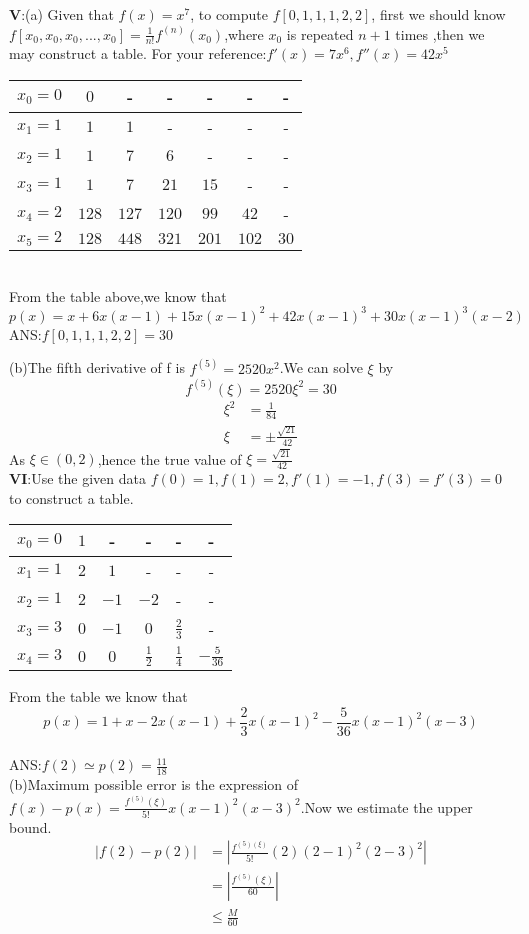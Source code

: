 \documentclass{ctexart}
\begin{document}
\textbf{V}:(a) Given that $f(x)=x^7$, to compute $f[0,1,1,1,2,2]$, first we should know $f[x_0,x_0,x_0,...,x_0]=\frac{1}{n!}f^{(n)}(x_0)$,where $x_0$ is repeated $n+1$ times ,then we may construct a table. For your reference:$f'(x)=7x^6,f''(x)=42x^5$
\begin{table}[!htbp]
    \centering
    \begin{tabular}{|c|c|c|c|c|c|c|}
    \hline
    $x_0=0$&$0$&-&-&-&-&-\\
    \hline
    $x_1=1$&$1$&$1$&-&-&-&-\\
    \hline 
    $x_2=1$&$1$&$7$&$6$&-&-&-\\
    \hline
    $x_3=1$&$1$&$7$&$21$&$15$&-&-\\
    \hline
    $x_4=2$&$128$&$127$&$120$&$99$&$42$&-\\
    \hline
    $x_5=2$&$128$&$448$&$321$&$201$&$102$&$30$\\
    \hline
    \end{tabular}
\end{table}
\\
From the table above,we know that 
$$p(x)=x+6x(x-1)+15x(x-1)^2+42x(x-1)^3+30x(x-1)^3(x-2)$$
ANS:$f[0,1,1,1,2,2]=30$

(b)The fifth derivative of f is $f^{(5)}=2520x^2$.We can solve $\xi$ by
$$f^{(5)}(\xi )=2520\xi^2=30$$
\begin{align*}
    \xi^2&=\frac{1}{84}\\
    \xi&=\pm \frac{\sqrt{21}}{42}
\end{align*}
As $\xi \in (0,2)$,hence the true value of $\xi=\frac{\sqrt{21}}{42}$\\


\textbf{VI}:Use the given data $f(0)=1,f(1)=2,f'(1)=-1,f(3)=f'(3)=0$ to construct a table.

\begin{table}[!htbp]
    \centering
    \begin{tabular}{|c|c|c|c|c|c|}
    \hline
    $x_0=0$&$1$&-&-&-&-\\
    \hline
    $x_1=1$&$2$&$1$&-&-&-\\
    \hline 
    $x_2=1$&$2$&$-1$&$-2$&-&-\\
    \hline
    $x_3=3$&$0$&$-1$&$0$&$\frac{2}{3}$&-\\
    \hline
    $x_4=3$&$0$&$0$&$\frac{1}{2}$&$\frac{1}{4}$&$-\frac{5}{36}$\\
    \hline
    \end{tabular}
\end{table}
From the table we know that
$$p(x)=1+x-2x(x-1)+\frac{2}{3}x(x-1)^2-\frac{5}{36}x(x-1)^2(x-3)$$\\
ANS:$f(2)\simeq p(2)=\frac{11}{18}$\\
(b)Maximum possible error is the expression of $f(x)-p(x)=\frac{f^{(5)}(\xi)}{5!}x(x-1)^2(x-3)^2$.Now we estimate the upper bound.
\begin{align*}
    |f(2)-p(2)|&=|\frac{f^{(5)(\xi)}}{5!}(2)(2-1)^2(2-3)^2|\\
    &=|\frac{f^{(5)}(\xi)}{60}|\\
    &\leq \frac{M}{60}\\
\end{align*}
\end{document}

